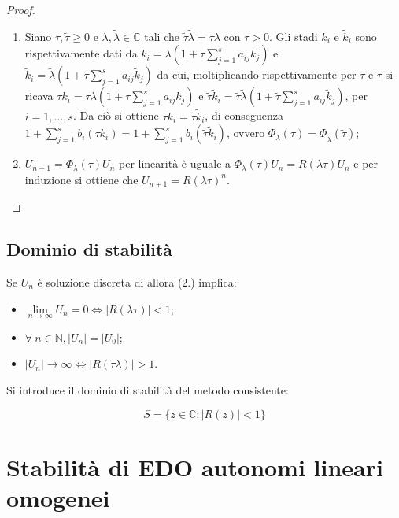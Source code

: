 \documentclass[hidelinks, 10pt]{report}
\begin{document}
\begin{proof}
\noindent
\begin{enumerate}
\item Siano $ \tau, \tilde{\tau} \ge 0 $ e $ \lambda, \tilde{\lambda} \in \mathbb{C} $ tali che $ \tilde{\tau} \tilde{\lambda} = \tau \lambda $ con $ \tau > 0 $. Gli stadi $ k_{i} $ e $ \tilde{k}_{i} $ sono rispettivamente dati da $ k_{i} = \lambda \left( 1 + \tau \sum\limits_{j = 1}^{s} a_{ij} k_{j} \right) $ e $ \tilde{k}_{i} = \tilde{\lambda} \left( 1 + \tilde{\tau} \sum\limits_{j = 1}^{s} a_{ij} \tilde{k}_{j} \right) $  da cui, moltiplicando rispettivamente per $ \tau $ e $ \tilde{\tau} $ si ricava $ \tau k_{i} = \tau \lambda \left( 1 + \tau \sum\limits_{j = 1}^{s} a_{ij} k_{j} \right) $ e $ \tilde{\tau}\tilde{k}_{i} = \tilde{\tau} \tilde{\lambda} \left( 1 + \tilde{\tau} \sum\limits_{j = 1}^{s} a_{ij} \tilde{k}_{j} \right) $, per $ i = 1, \dotsc, s $. Da ci\`o si ottiene $ \tau k_{i} = \tilde{\tau} \tilde{k}_{i} $, di conseguenza $ 1 + \sum\limits_{j = 1}^{s} b_{i} (\tau k_{i}) = 1 + \sum\limits_{j = 1}^{s} b_{i} (\tilde{\tau} \tilde{k}_{i}) $, ovvero $ \Phi_{\lambda}(\tau) = \Phi_{\tilde{\lambda}} (\tilde{\tau}) $;
\item $ U_{n + 1} = \Phi_{\lambda} (\tau) U_{n} $ per linearit\`a \`e uguale a $ \Phi_{\lambda} (\tau) U_{n} = R(\lambda \tau) U_{n} $ e per induzione si ottiene che $ U_{n + 1} = R(\lambda \tau)^{n} $.
\end{enumerate}
\end{proof}

\subsection{Dominio di stabilit\`a}
Se $ U_{n} $ \`e soluzione discreta di  allora  (2.) implica:
\begin{itemize}
\item $ \lim\limits_{n \to \infty} U_{n} = 0 \iff \vert R(\lambda \tau) \vert < 1 $;
\item $ \forall\ n \in \mathbb{N}, \vert U_{n} \vert = \vert U_{0} \vert $;
\item $ \vert U_{n} \vert \to \infty \iff \vert R(\tau \lambda) \vert > 1 $.
\end{itemize}

Si introduce il dominio di stabilit\`a del metodo consistente:

\[ S = \{ z \in \mathbb{C} : \vert R(z) \vert < 1 \} \]

\section{Stabilit\`a di EDO autonomi lineari omogenei}
\end{document}
